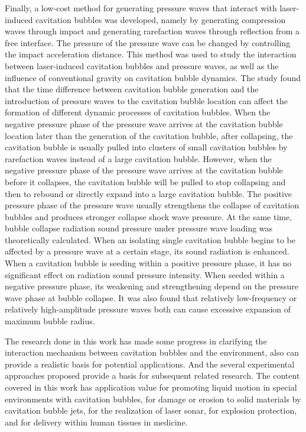 \begin{englishabstract}
Finally, a low-cost method for generating pressure waves that interact with laser-induced cavitation bubbles was developed, namely by generating compression waves through impact and generating rarefaction waves through reflection from a free interface. The pressure of the pressure wave can be changed by controlling the impact acceleration distance. This method was used to study the interaction between laser-induced cavitation bubbles and pressure waves, as well as the influence of conventional gravity on cavitation bubble dynamics. The study found that the time difference between cavitation bubble generation and the introduction of pressure waves to the cavitation bubble location can affect the formation of different dynamic processes of cavitation bubbles. When the negative pressure phase of the pressure wave arrives at the cavitation bubble location later than the generation of the cavitation bubble, after collapsing, the cavitation bubble is usually pulled into clusters of small cavitation bubbles by rarefaction waves instead of a large cavitation bubble. However, when the negative pressure phase of the pressure wave arrives at the cavitation bubble before it collapses, the cavitation bubble will be pulled to stop collapsing and then to rebound or directly expand into a large cavitation bubble. The positive pressure phase of the pressure wave usually strengthens the collapse of cavitation bubbles and produces stronger collapse shock wave pressure. At the same time, bubble collapse radiation sound pressure under pressure wave loading was theoretically calculated. When an isolating single cavitation bubble begins to be affected by a pressure wave at a certain stage, its sound radiation is enhanced. When a cavitation bubble is seeding within a positive pressure phase, it has no significant effect on radiation sound pressure intensity. When seeded within a negative pressure phase, its weakening and strengthening depend on the pressure wave phase at bubble collapse. It was also found that relatively low-frequency or relatively high-amplitude pressure waves both can cause excessive expansion of maximum bubble radius.

The research done in this work has made some progress in clarifying the interaction mechanism between cavitation bubbles and the environment, also can provide a realistic basis for potential applications. And the several experimental approaches proposed provide a basis for subsequent related research. The content covered in this work has application value for promoting liquid motion in special environments with cavitation bubbles, for damage or erosion to solid materials by cavitation bubble jets, for the realization of laser sonar, for explosion protection, and for delivery within human tissues in medicine.

\end{englishabstract}
